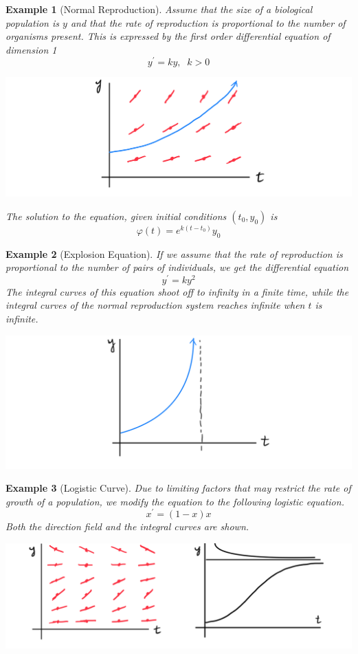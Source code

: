 \documentclass{article}
\newtheorem{example}{Example}[section]
\theoremstyle{remark}
\theoremstyle{definition}
\begin{document}
\begin{example}[Normal Reproduction]
Assume that the size of a biological population is $y$ and that the rate of reproduction is proportional to the number of organisms present. This is expressed by the first order differential equation of dimension 1 
\[y^\prime = k y, \;\; k > 0\] 
\begin{center}
    \includegraphics[scale=0.2]{img/Normal_Reproduction.PNG}
\end{center}
The solution to the equation, given initial conditions $(t_0, y_0)$ is 
\[\varphi(t) = e^{k (t - t_0)} y_0\]
\end{example}

\begin{example}[Explosion Equation]
If we assume that the rate of reproduction is proportional to the number of pairs of individuals, we get the differential equation 
\[y^\prime = k y^2\]
The integral curves of this equation shoot off to infinity in a finite time, while the integral curves of the normal reproduction system reaches infinite when $t$ is infinite. 
\begin{center}
    \includegraphics[scale=0.25]{img/Explosion_Equation.PNG}
\end{center}
\end{example}

\begin{example}[Logistic Curve]
Due to limiting factors that may restrict the rate of growth of a population, we modify the equation to the following \textit{logistic equation}. 
\[x^\prime = (1 - x) x\]
Both the direction field and the integral curves are shown. 
\begin{center}
    \includegraphics[scale=0.15]{img/Logistic_Curve.PNG}
\end{center}
\end{example}
\end{document}
